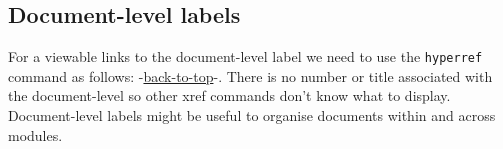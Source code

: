 \subsection*{Document-level labels}
For a viewable links to the document-level label we need to use the \texttt{hyperref} command as follows: -\hyperref[doc:testdoc]{back-to-top}-. There is no number or title associated with the document-level so other xref commands don't know what to display. Document-level labels might be useful to organise documents within and across modules.
